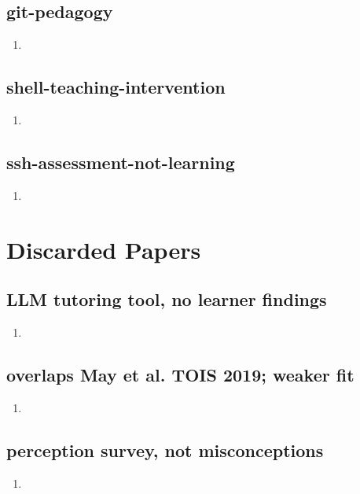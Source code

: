 \documentclass{article}
\begin{document}
\subsection{git-pedagogy}
\begin{enumerate}
\item {}
\end{enumerate}

\subsection{shell-teaching-intervention}
\begin{enumerate}
\item {}
\end{enumerate}

\subsection{ssh-assessment-not-learning}
\begin{enumerate}
\item {}
\end{enumerate}

\section{Discarded Papers}
\subsection{LLM tutoring tool, no learner findings}
\begin{enumerate}
\item {}
\end{enumerate}

\subsection{overlaps May et al. TOIS 2019; weaker fit}
\begin{enumerate}
\item {}
\end{enumerate}

\subsection{perception survey, not misconceptions}
\begin{enumerate}
\item {}
\end{enumerate}
\end{document}
